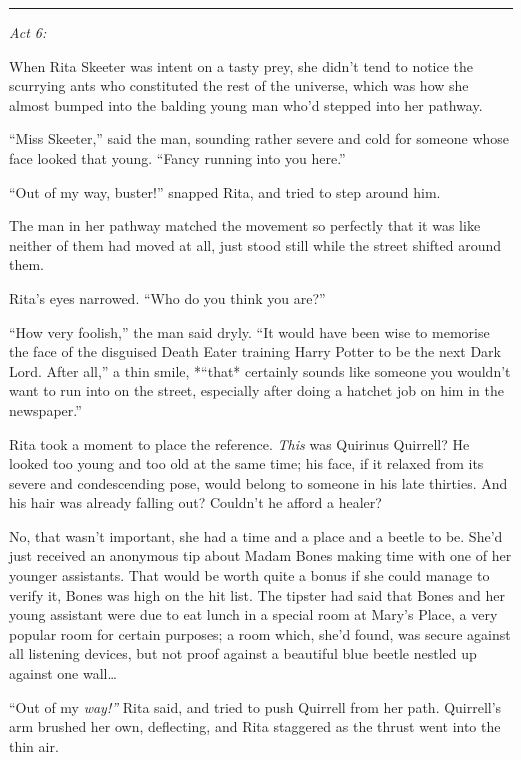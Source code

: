 \begin{center}\rule{3in}{0.4pt}\end{center}

\emph{Act 6:}

When Rita Skeeter was intent on a tasty prey, she didn't tend to notice
the scurrying ants who constituted the rest of the universe, which was
how she almost bumped into the balding young man who'd stepped into her
pathway.

``Miss Skeeter,'' said the man, sounding rather severe and cold for
someone whose face looked that young. ``Fancy running into you here.''

``Out of my way, buster!'' snapped Rita, and tried to step around him.

The man in her pathway matched the movement so perfectly that it was
like neither of them had moved at all, just stood still while the street
shifted around them.

Rita's eyes narrowed. ``Who do you think you are?''

``How very foolish,'' the man said dryly. ``It would have been wise to
memorise the face of the disguised Death Eater training Harry Potter to
be the next Dark Lord. After all,'' a thin smile, *``that* certainly
sounds like someone you wouldn't want to run into on the street,
especially after doing a hatchet job on him in the newspaper.''

Rita took a moment to place the reference. \emph{This} was Quirinus
Quirrell? He looked too young and too old at the same time; his face, if
it relaxed from its severe and condescending pose, would belong to
someone in his late thirties. And his hair was already falling out?
Couldn't he afford a healer?

No, that wasn't important, she had a time and a place and a beetle to
be. She'd just received an anonymous tip about Madam Bones making time
with one of her younger assistants. That would be worth quite a bonus if
she could manage to verify it, Bones was high on the hit list. The
tipster had said that Bones and her young assistant were due to eat
lunch in a special room at Mary's Place, a very popular room for certain
purposes; a room which, she'd found, was secure against all listening
devices, but not proof against a beautiful blue beetle nestled up
against one wall\ldots{}

``Out of my \emph{way!''} Rita said, and tried to push Quirrell from her
path. Quirrell's arm brushed her own, deflecting, and Rita staggered as
the thrust went into the thin air.

